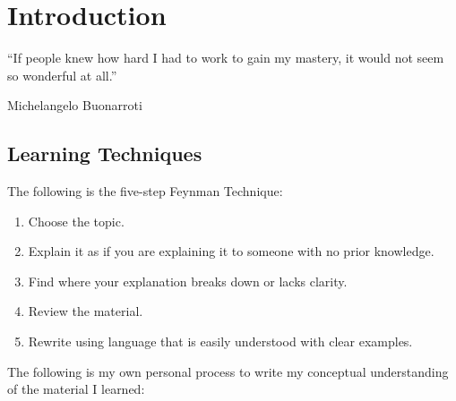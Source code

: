 \frenchspacing
\chapter{Introduction}
\epigraph{“If people knew how hard I had to work to gain my mastery, it would not seem so wonderful at all.”}{Michelangelo Buonarroti}

\section{Learning Techniques}
The following is the five-step Feynman Technique:
\begin{enumerate}
    \item Choose the topic.
    \item Explain it as if you are explaining it to someone with no prior knowledge.
    \item Find where your explanation breaks down or lacks clarity.
    \item Review the material.
    \item Rewrite using language that is easily understood with clear examples.
\end{enumerate}
The following is my own personal process to write my conceptual understanding of the material I learned:


